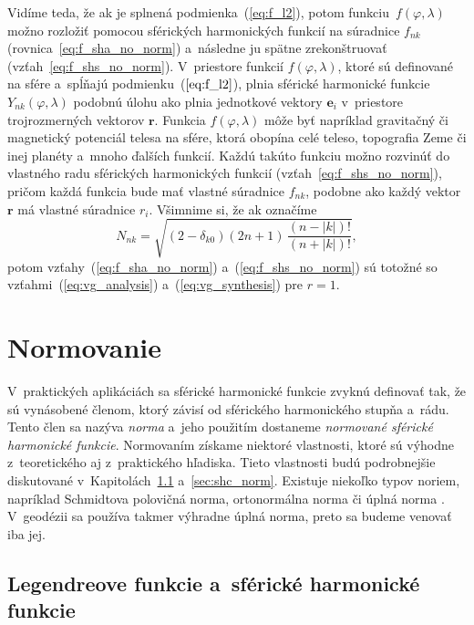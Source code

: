 \documentclass[a4paper, 12pt]{book}
\let\vec\mathbf
\begin{document}
Vidíme teda, že ak je splnená podmienka~(\ref{eq:f_l2}), potom 
funkciu~$f(\varphi, \lambda)$ možno rozložiť pomocou sférických harmonických 
funkcií na súradnice $f_{nk}$ (rovnica~\ref{eq:f_sha_no_norm}) a~následne ju 
spätne zrekonštruovať (vzťah~\ref{eq:f_shs_no_norm}).  V~priestore funkcií 
$f(\varphi, \lambda)$, ktoré sú definované na sfére a~spĺňajú 
podmienku~($\ref{eq:f_l2}$), plnia sférické harmonické funkcie $Y_{nk}(\varphi, 
\lambda)$ podobnú úlohu ako plnia jednotkové vektory $\vec e_i$ v~priestore 
trojrozmerných vektorov $\vec r$.  Funkcia $f(\varphi,\lambda)$ môže byť 
napríklad gravitačný či magnetický potenciál telesa na sfére, ktorá obopína 
celé teleso, topografia Zeme či inej planéty a~mnoho ďalších funkcií.  Každú 
takúto funkciu možno rozvinúť do vlastného radu sférických harmonických funkcií 
(vzťah~\ref{eq:f_shs_no_norm}), pričom každá funkcia bude mať vlastné súradnice 
$f_{nk}$, podobne ako každý vektor $\vec r$ má vlastné súradnice $r_i$.  
Všimnime si, že ak označíme
%
\begin{equation}
\label{eq:sh_norm}
N_{nk} = \sqrt{(2 - \delta_{k0}) (2n + 1) \, \frac{(n - |k|)!}{(n
+ |k|)!}}{,}
\end{equation}
%
potom vzťahy~(\ref{eq:f_sha_no_norm}) a~(\ref{eq:f_shs_no_norm}) sú totožné so
vzťahmi~(\ref{eq:vg_analysis}) a~(\ref{eq:vg_synthesis}) pre $r = 1$.



\section{Normovanie}
\label{sec:normalization}

V~praktických aplikáciách sa sférické harmonické funkcie zvyknú definovať tak, 
že sú vynásobené členom, ktorý závisí od sférického harmonického stupňa a~rádu.  
Tento člen sa nazýva \emph{norma} a~jeho použitím dostaneme \emph{normované 
sférické harmonické funkcie}.  Normovaním získame niektoré vlastnosti, ktoré sú 
výhodne z~teoretického aj z~praktického hľadiska.  Tieto vlastnosti budú 
podrobnejšie diskutované v~Kapitolách~\ref{sec:leg_sh_norm} 
a~\ref{sec:shc_norm}.  Existuje niekoľko typov noriem, napríklad Schmidtova 
polovičná norma, ortonormálna norma či úplná norma \parencite{SHTOOLS}.  
V~geodézii sa používa takmer výhradne úplná norma, preto sa budeme venovať iba 
jej.

\subsection{Legendreove funkcie a~sférické harmonické funkcie}
\label{sec:leg_sh_norm}
\end{document}
